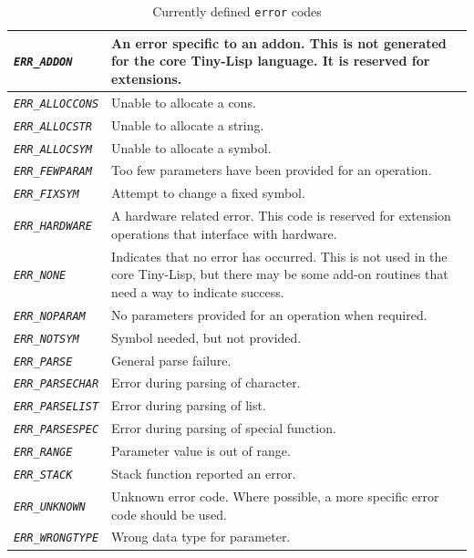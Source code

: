 \documentclass[10pt, openany]{book}
\newcommand{\constant}[1]{\emph{\texttt{#1}}}
\newcommand{\datatype}[1]{\texttt{#1}}
\newcommand{\tl}{Tiny-Lisp}
\begin{document}
\begin{table}
  \centering
  \caption{Currently defined \datatype{error} codes}
  \label{tbl:Error}
  \begin{tabular}{ l | p{12cm}}
    \hline
    \constant{ERR\_ADDON} & An error specific to an addon.  This is not generated for the core \tl{} language.  It is reserved for extensions.\\
    \hline
    \constant{ERR\_ALLOCCONS} & Unable to allocate a cons.\\
    \hline
    \constant{ERR\_ALLOCSTR} & Unable to allocate a string.\\
    \hline
    \constant{ERR\_ALLOCSYM} & Unable to allocate a symbol.\\
    \hline
    \constant{ERR\_FEWPARAM} & Too few parameters have been provided for an operation.\\
    \hline
    \constant{ERR\_FIXSYM} & Attempt to change a fixed symbol.\\
    \hline
    \constant{ERR\_HARDWARE} & A hardware related error.  This code is reserved for extension operations that interface with hardware.\\
    \hline
    \constant{ERR\_NONE} & Indicates that no error has occurred.  This is not used in the core \tl{}, but there may be some add-on routines that need a way to indicate success.\\
    \hline
    \constant{ERR\_NOPARAM} & No parameters provided for an operation when required.\\
    \hline
    \constant{ERR\_NOTSYM} &  Symbol needed, but not provided.\\
    \hline
    \constant{ERR\_PARSE} & General parse failure.\\
    \hline
    \constant{ERR\_PARSECHAR} & Error during parsing of character.\\
    \hline
    \constant{ERR\_PARSELIST} & Error during parsing of list.\\
    \hline
    \constant{ERR\_PARSESPEC} & Error during parsing of special function.\\
    \hline
    \constant{ERR\_RANGE} & Parameter value is out of range.\\
    \hline
    \constant{ERR\_STACK} & Stack function reported an error.\\
    \hline
    \constant{ERR\_UNKNOWN} & Unknown error code.  Where possible, a more specific error code should be used.\\
    \hline
    \constant{ERR\_WRONGTYPE} & Wrong data type for parameter.\\
    \hline
  \end{tabular}
\end{table}
\end{document}
